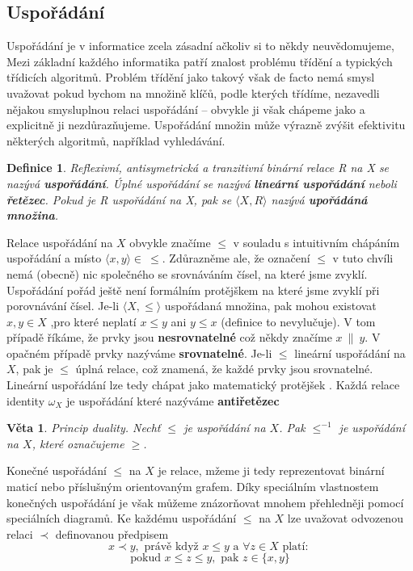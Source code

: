 \documentclass[12pt,a4paper]{article}
\newtheorem{definition}{Definice}
\newtheorem{sentence}{Věta}
\begin{document}
\subsection{Uspořádání}
Uspořádání je v informatice zcela zásadní ačkoliv si to někdy neuvědomujeme, Mezi základní každého informatika patří znalost problému třídění a typických třídicích algoritmů. Problém třídění jako takový však de facto nemá smysl uvažovat pokud bychom na množině klíčů, podle kterých třídíme, nezavedli nějakou smysluplnou relaci uspořádání -- obvykle ji však chápeme jako  a explicitně ji nezdůrazňujeme. Uspořádání množin může výrazně zvýšit efektivitu některých algoritmů, například vyhledávání.

\begin{definition}
	Reflexivní, antisymetrická a tranzitivní binární relace R na X se nazývá \textbf{uspořádání}. Úplné uspořádání se nazývá \textbf{lineární uspořádání} neboli \textbf{řetězec}. Pokud je R uspořádání na X, pak se $\langle X, R \rangle$ nazývá \textbf{upořádáná množina}.
\end{definition}

Relace uspořádání na $X$ obvykle značíme $\leq$ v souladu s intuitivním chápáním uspořádání a místo $\langle x ,y \rangle \in \ \leq$. Zdůrazněme ale, že označení $\leq$ v tuto chvíli nemá (obecně) nic společného se srovnáváním čísel, na které jsme zvyklí. Uspořádání pořád ještě není formálním protějškem  na které jsme zvyklí při porovnávání čísel. Je-li $\langle X, \leq \rangle$ uspořádaná množina, pak mohou  existovat $x,y \in X$ ,pro které neplatí $x \leq y$ ani $y \leq x$ (definice to nevylučuje). V tom případě říkáme, že prvky jsou \textbf{nesrovnatelné} což někdy značíme $x\ \| \ y$. V opačném případě prvky nazýváme \textbf{srovnatelné}. Je-li $\leq$ lineární uspořádání na $X$, pak je $\leq$ úplná relace, což znamená, že každé prvky jsou srovnatelné. Lineární uspořádání lze tedy chápat jako matematický protějšek . Každá relace identity $\omega_X$ je uspořádání které nazýváme \textbf{antiřetězec}

\begin{sentence}
	Princip duality. Nechť $\leq$ je uspořádání na $X$. Pak $\leq^{-1}$ je uspořádání na $X$, které označujeme $\geq$.
\end{sentence}

Konečné uspořádání $\leq$ na $X$ je relace, mžeme ji tedy reprezentovat binární maticí nebo příslušným orientovaným grafem. Díky speciálním vlastnostem konečných uspořádání je však můžeme znázorňovat mnohem přehledněji pomocí speciálních diagramů. Ke každému uspořádání $\leq$ na $X$ lze uvažovat odvozenou relaci $\prec$ definovanou předpisem
$$x \prec y, \text{ právě když } x \leq y \text{ a } \forall z \in X \text{ platí: }$$
$$\text{pokud } x \leq z \leq y, \text{ pak } z \in \{ x, y\}$$
\end{document}
